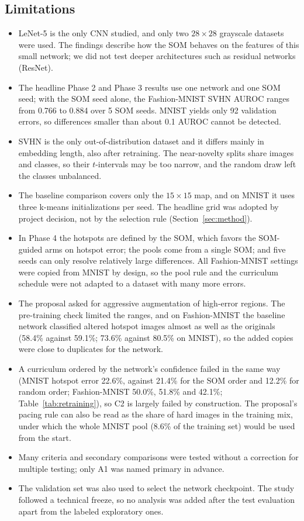 \documentclass[preprint,review,12pt]{elsarticle}
\begin{document}
\subsection{Limitations}
\begin{itemize}
  \item LeNet-5 is the only CNN studied, and only two $28\times28$ grayscale datasets were used. The findings describe how the SOM behaves on the features of this small network; we did not test deeper architectures such as residual networks (ResNet).
  \item The headline Phase 2 and Phase 3 results use one network and one SOM seed; with the SOM seed alone, the Fashion-MNIST SVHN AUROC ranges from 0.766 to 0.884 over 5 SOM seeds. MNIST yields only 92 validation errors, so differences smaller than about 0.1 AUROC cannot be detected.
  \item SVHN is the only out-of-distribution dataset and it differs mainly in embedding length, also after retraining. The near-novelty splits share images and classes, so their $t$-intervals may be too narrow, and the random draw left the classes unbalanced.
  \item The baseline comparison covers only the $15\times15$ map, and on MNIST it uses three k-means initializations per seed. The headline grid was adopted by project decision, not by the selection rule (Section~\ref{sec:method}).
  \item In Phase 4 the hotspots are defined by the SOM, which favors the SOM-guided arms on hotspot error; the pools come from a single SOM; and five seeds can only resolve relatively large differences. All Fashion-MNIST settings were copied from MNIST by design, so the pool rule and the curriculum schedule were not adapted to a dataset with many more errors.
  \item The proposal asked for aggressive augmentation of high-error regions. The pre-training check limited the ranges, and on Fashion-MNIST the baseline network classified altered hotspot images almost as well as the originals (58.4\% against 59.1\%; 73.6\% against 80.5\% on MNIST), so the added copies were close to duplicates for the network.
  \item A curriculum ordered by the network's confidence failed in the same way (MNIST hotspot error 22.6\%, against 21.4\% for the SOM order and 12.2\% for random order; Fashion-MNIST 50.0\%, 51.8\% and 42.1\%; Table~\ref{tab:retraining}), so C2 is largely failed by construction. The proposal's pacing rule can also be read as the share of hard images in the training mix, under which the whole MNIST pool (8.6\% of the training set) would be used from the start.
  \item Many criteria and secondary comparisons were tested without a correction for multiple testing; only A1 was named primary in advance.
  \item The validation set was also used to select the network checkpoint. The study followed a technical freeze, so no analysis was added after the test evaluation apart from the labeled exploratory ones.
\end{itemize}
\end{document}
